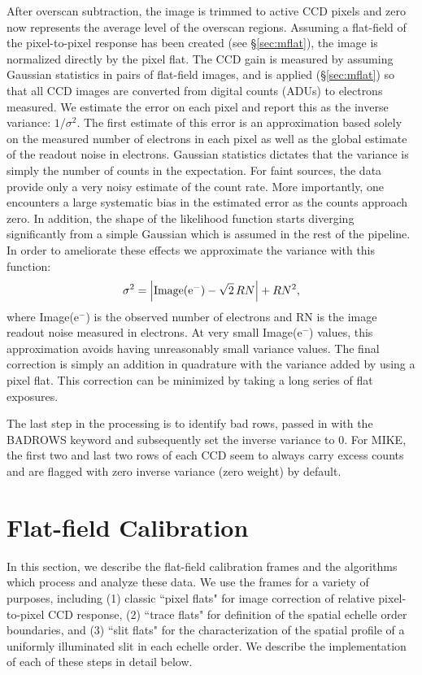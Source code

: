 \documentclass[12pt,preprint]{aastex}
\begin{document}
After overscan subtraction, the image is trimmed to active CCD pixels
and zero now represents the average level of the overscan regions.  
Assuming a flat-field of the pixel-to-pixel response has been created
(see \S\ref{sec:mflat}), the image is normalized directly by the pixel flat.
The CCD gain is measured by assuming Gaussian statistics in pairs of flat-field
images, and is applied (\S\ref{sec:mflat}) 
so that all CCD images are converted from digital counts (ADUs)
to electrons measured.
We estimate the error on each pixel and report this as the inverse
variance: $1/\sigma^2$.  
The first estimate of this error is an approximation
based solely on the measured number of electrons in each pixel as well as
the global estimate of the readout noise in electrons.  Gaussian statistics
dictates that the variance is simply the number of counts in the expectation.
For faint sources, the data provide only a very
noisy estimate of the count rate. 
More importantly, one encounters a large
systematic bias in the estimated error as the counts approach zero.  
In addition, the shape of the likelihood function starts diverging 
significantly from a simple Gaussian which is assumed in the rest of 
the pipeline.  In order to ameliorate these effects we approximate the
variance with this function:
\begin{equation}
\sigma^2 = \left|{\rm Image(e^{-})} - \sqrt{2}\,RN\right| + RN^2,
\end{equation}
where Image(e$^-$) is the observed number of electrons and
RN is the image readout noise measured in electrons.
At very small Image(e$^-$) values, this approximation avoids
having unreasonably small variance values.
The final correction is simply an addition in quadrature with
the variance added by using a pixel flat.
This correction can be minimized by taking a long series of flat exposures.

The last step in the processing is to identify bad rows, passed in with 
the BADROWS keyword and subsequently set the inverse variance to 0.
For MIKE, the first two and last two rows of each CCD seem to always
carry excess counts and are flagged with zero inverse variance (zero weight)
by default.

\section{Flat-field Calibration}
\label{sec:flatfield}

In this section, we describe the flat-field calibration frames
and the algorithms which process and analyze these data.  We
use the frames for a variety of purposes, including 
(1) classic ``pixel flats" for image correction of relative 
pixel-to-pixel CCD response, 
(2) ``trace flats" for definition of the spatial echelle order boundaries, and
(3) ``slit flats" for the characterization of the spatial profile 
of a uniformly illuminated slit in each echelle order.
We describe the implementation of each of these steps in detail below.
\end{document}
